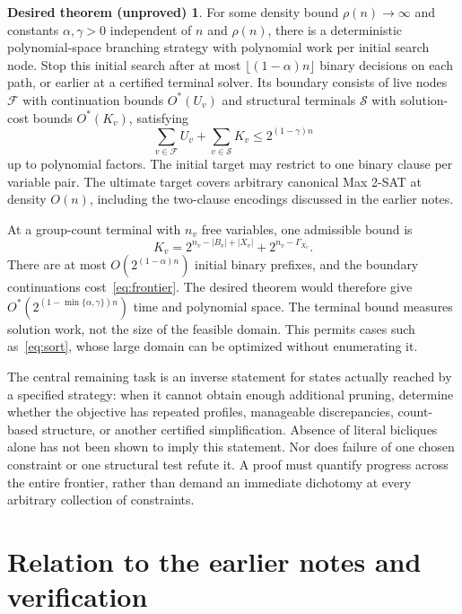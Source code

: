 \documentclass[11pt,a4paper]{article}
\theoremstyle{definition}
\newtheorem*{desiredtheorem}{Desired theorem (unproved)}
\newcommand{\Ostar}{O^{*}}
\begin{document}
\begin{desiredtheorem}
For some density bound $\rho(n)\to\infty$ and constants
$\alpha,\gamma>0$ independent of $n$ and $\rho(n)$, there is a deterministic
polynomial-space branching strategy with polynomial work per initial
search node. Stop this initial search after at most
$\lfloor(1-\alpha)n\rfloor$ binary decisions on each path, or earlier at
a certified terminal solver. Its boundary consists of live nodes
$\mathcal F$ with continuation bounds $\Ostar(U_v)$ and structural
terminals $\mathcal S$ with solution-cost bounds $\Ostar(K_v)$, satisfying
\begin{equation}
 \sum_{v\in\mathcal F}U_v+\sum_{v\in\mathcal S}K_v
 \le 2^{(1-\gamma)n} \label{eq:frontier}
\end{equation}
up to polynomial factors. The initial target may restrict to one binary
clause per variable pair. The ultimate target covers arbitrary canonical
Max 2-SAT at density $O(n)$, including the two-clause encodings discussed
in the earlier notes.
\end{desiredtheorem}

At a group-count terminal with $n_v$ free variables, one admissible bound is
\[
 K_v=2^{n_v-|B_v|+|X_v|}+2^{n_v-\Gamma_{X_v}}.
\]
There are at most $O(2^{(1-\alpha)n})$ initial binary prefixes, and the
boundary continuations cost~\eqref{eq:frontier}. The desired theorem would
therefore give
$\Ostar(2^{(1-\min\{\alpha,\gamma\})n})$ time and polynomial space.
The terminal bound measures solution work, not the size of the feasible
domain. This permits cases such as~\eqref{eq:sort}, whose large domain
can be optimized without enumerating it.

The central remaining task is an inverse statement for states actually
reached by a specified strategy: when it cannot obtain enough additional
pruning, determine whether the objective has repeated profiles,
manageable discrepancies, count-based structure, or another certified
simplification. Absence of literal bicliques alone has not been shown
to imply this statement. Nor does failure of one chosen constraint or
one structural test refute it. A proof must quantify progress across
the entire frontier, rather than demand an immediate dichotomy at every
arbitrary collection of constraints.

\clearpage
\section{Relation to the earlier notes and verification}\label{sec:relation}
\end{document}
